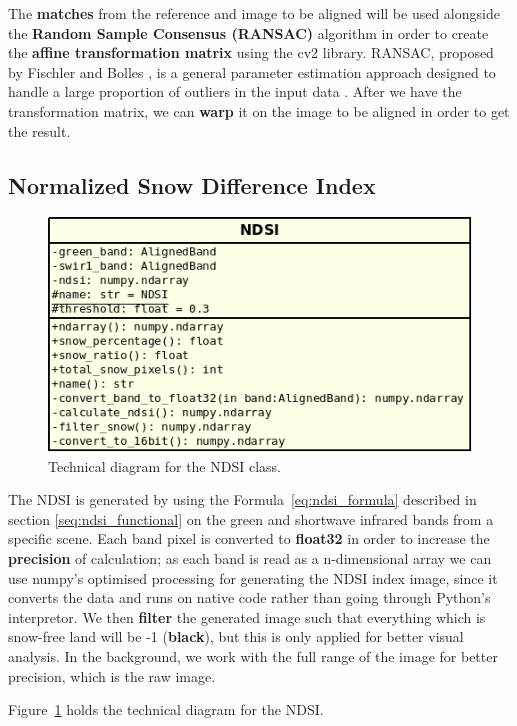 \documentclass[12pt, a4paper]{report}
\begin{document}
	\par The \textbf{matches} from the reference and image to be aligned will be used alongside the \textbf{Random Sample Consensus (RANSAC)} algorithm in order to create the \textbf{affine transformation matrix} using the cv2 library. RANSAC, proposed by Fischler and Bolles \cite{ransac}, is a general parameter estimation approach designed to handle a large proportion of outliers in the input data \cite{ransac2}. After we have the transformation matrix, we can \textbf{warp} it on the image to be aligned in order to get the result. 
	
	\subsection{Normalized Snow Difference Index}
	\label{seq:ndsi_implementation}
	
	\begin{figure}[h!]
		\centering
		\includegraphics[scale=0.6]{../images/ndsi_diagram.png}
		\caption{Technical diagram for the NDSI class.}
		\label{fig:ndsi_diagram}
	\end{figure}

	\par The NDSI is generated by using the Formula~\ref{eq:ndsi_formula} described in section \ref{seq:ndsi_functional} on the green and shortwave infrared bands from a specific scene. Each band pixel is converted to \textbf{float32} in order to increase the \textbf{precision} of calculation; as each band is read as a n-dimensional array we can use numpy's optimised processing for generating the NDSI index image, since it converts the data and runs on native code rather than going through Python's interpretor. We then \textbf{filter} the generated image such that everything which is snow-free land will be -1 (\textbf{black}), but this is only applied for better visual analysis. In the background, we work with the full range of the image for better precision, which is the raw image. 
	\par Figure~\ref{fig:ndsi_diagram} holds the technical diagram for the NDSI.
\end{document}
